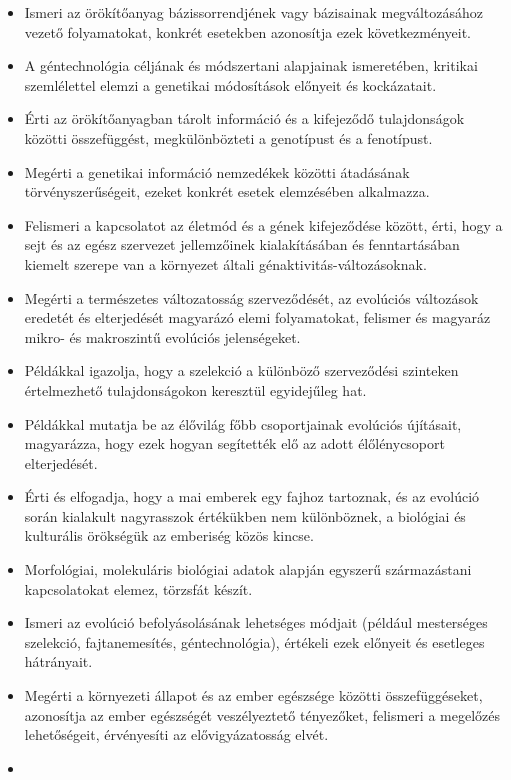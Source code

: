 \begin{itemize}
\item
  Ismeri az örökítőanyag bázissorrendjének vagy bázisainak
  megváltozásához vezető folyamatokat, konkrét esetekben azonosítja ezek
  következményeit.
\item
  A géntechnológia céljának és módszertani alapjainak ismeretében,
  kritikai szemlélettel elemzi a genetikai módosítások előnyeit és
  kockázatait.
\item
  Érti az örökítőanyagban tárolt információ és a kifejeződő
  tulajdonságok közötti összefüggést, megkülönbözteti a genotípust és a
  fenotípust.
\item
  Megérti a genetikai információ nemzedékek közötti átadásának
  törvényszerűségeit, ezeket konkrét esetek elemzésében alkalmazza.
\item
  Felismeri a kapcsolatot az életmód és a gének kifejeződése között,
  érti, hogy a sejt és az egész szervezet jellemzőinek kialakításában és
  fenntartásában kiemelt szerepe van a környezet általi
  génaktivitás-változásoknak.
\item
  Megérti a természetes változatosság szerveződését, az evolúciós
  változások eredetét és elterjedését magyarázó elemi folyamatokat,
  felismer és magyaráz mikro- és makroszintű evolúciós jelenségeket.
\item
  Példákkal igazolja, hogy a szelekció a különböző szerveződési
  szinteken értelmezhető tulajdonságokon keresztül egyidejűleg hat.
\item
  Példákkal mutatja be az élővilág főbb csoportjainak evolúciós
  újításait, magyarázza, hogy ezek hogyan segítették elő az adott
  élőlénycsoport elterjedését.
\item
  Érti és elfogadja, hogy a mai emberek egy fajhoz tartoznak, és az
  evolúció során kialakult nagyrasszok értékükben nem különböznek, a
  biológiai és kulturális örökségük az emberiség közös kincse.
\item
  Morfológiai, molekuláris biológiai adatok alapján egyszerű
  származástani kapcsolatokat elemez, törzsfát készít.
\item
  Ismeri az evolúció befolyásolásának lehetséges módjait (például
  mesterséges szelekció, fajtanemesítés, géntechnológia), értékeli ezek
  előnyeit és esetleges hátrányait.
\item
  Megérti a környezeti állapot és az ember egészsége közötti
  összefüggéseket, azonosítja az ember egészségét veszélyeztető
  tényezőket, felismeri a megelőzés lehetőségeit, érvényesíti az
  elővigyázatosság elvét.
\item

\end{itemize}
